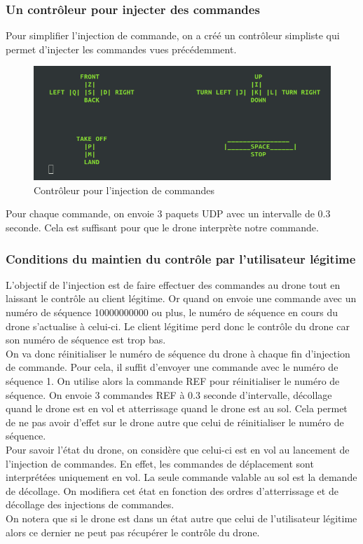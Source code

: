 \subsubsection{Un contrôleur pour injecter des commandes}
Pour simplifier l'injection de commande, on a créé un contrôleur simpliste qui permet d'injecter les commandes vues précédemment.

\begin{figure}[H]
  \centering
  \includegraphics[scale=0.6]{images/injection_command_controler.png}
  \caption{Contrôleur pour l'injection de commandes}
\end{figure}

Pour chaque commande, on envoie 3 paquets UDP avec un intervalle de 0.3 seconde. Cela est suffisant pour que le drone interprète notre commande.

\subsubsection{Conditions du maintien du contrôle par l'utilisateur légitime}
L'objectif de l'injection est de faire effectuer des commandes au drone tout en laissant le contrôle au client légitime. Or quand on envoie une commande avec un numéro de séquence 10000000000 ou plus, le numéro de séquence en cours du drone s'actualise à celui-ci. Le client légitime perd donc le contrôle du drone car son numéro de séquence est trop bas.\\
On va donc réinitialiser le numéro de séquence du drone à chaque fin d'injection de commande. Pour cela, il suffit d'envoyer une commande avec le numéro de séquence 1. On utilise alors la commande REF pour réinitialiser le numéro de séquence. On envoie 3 commandes REF à 0.3 seconde d'intervalle, décollage quand le drone est en vol et atterrissage quand le drone est au sol. Cela permet de ne pas avoir d'effet sur le drone autre que celui de réinitialiser le numéro de séquence.\\
Pour savoir l'état du drone, on considère que celui-ci est en vol au lancement de l'injection de commandes. En effet, les commandes de déplacement sont interprétées uniquement en vol. La seule commande valable au sol est la demande de décollage. On modifiera cet état en fonction des ordres d’atterrissage et de décollage des injections de commandes.\\
On notera que si le drone est dans un état autre que celui de l'utilisateur légitime alors ce dernier ne peut pas récupérer le contrôle du drone.


